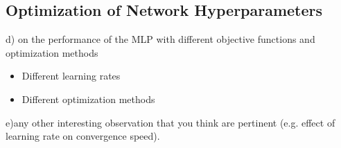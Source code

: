 \subsection{Optimization of Network Hyperparameters}\label{subsec:optNet}
d) on the performance of the MLP with different objective functions and optimization methods
\begin{itemize}
   	\item Different learning rates
	    	
   	\item Different optimization methods
\end{itemize}
e)any other interesting observation that you think are pertinent (e.g. effect of learning rate on convergence speed).